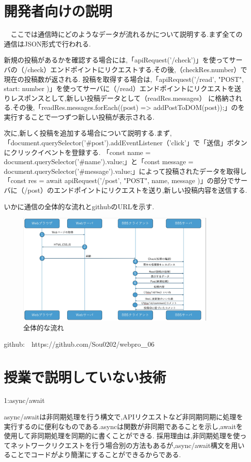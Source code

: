 \documentclass{jsarticle}
\begin{document}
\section{開発者向けの説明}
　ここでは通信時にどのようなデータが流れるかについて説明する.まず全ての通信はJSON形式で行われる.\par
新規の投稿があるかを確認する場合には,「apiRequest('/check')」を使ってサーバの（/check）エンドポイントにリクエストする.その後,（checkRes.number）で現在の投稿数が返される.
投稿を取得する場合は,「apiRequest('/read', "POST", { start: number })」を使ってサーバに（/read）エンドポイントにリクエストを送りレスポンスとして,新しい投稿データとして（readRes.messages）
に格納される.その後,「readRes.messages.forEach((post) => addPostToDOM(post));」のを実行することで一つずつ新しい投稿が表示される.\par
次に,新しく投稿を追加する場合について説明する.まず,「document.querySelector('#post').addEventListener（'click'」で「送信」ボタンにクリックイベントを登録する.
「const name = document.querySelector('#name').value;」と「const message = document.querySelector('#message').value;」によって投稿されたデータを取得し
「const res = await apiRequest('/post', "POST", { name, message })」の部分でサーバに（/post）のエンドポイントにリクエストを送り,新しい投稿内容を送信する.\par
いかに通信の全体的な流れとgithubのURLを示す.\par

\begin{figure}[H]
    \centering
    \includegraphics[width=10cm]{fig/zu.jpeg}
    \caption{全体的な流れ}
    \label{photoreflector_characteristic}
\end{figure}

\par
github:　https://github.com/Sou0202/webpro＿06


\section{授業で説明していない技術}
1:async/await\par
async/awaitは非同期処理を行う構文で,APIリクエストなど非同期同期に処理を実行するのに便利なものである.asyncは関数が非同期であることを示し,awaitを使用して非同期処理を同期的に書くことができる.
採用理由は,非同期処理を使ってネットワークリクエストを行う場合別の方法もあるが,async/await構文を用いることでコードがより簡潔にすることができるからである.\par
\end{document}
